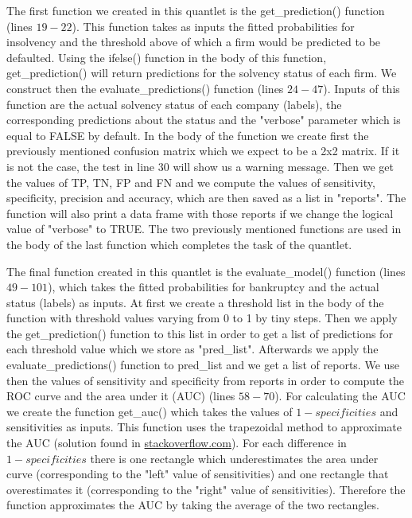 \documentclass{article}
\begin{document}
The first function we created in this quantlet is the get\_prediction() function (lines $19-22$). This function takes as inputs the fitted probabilities for insolvency and the threshold above of which a firm would be predicted to be defaulted. Using the ifelse() function in the body of this function, get\_prediction() will return predictions for the solvency status of each firm. We construct then the evaluate\_predictions() function (lines $24-47$). Inputs of this function are the actual solvency status of each company (labels), the corresponding predictions about the status and the "verbose" parameter which is equal to FALSE by default. In the body of the function we create first the previously mentioned confusion matrix which we expect to be a 2x2 matrix. If it is not the case, the test in line 30 will show us a warning message. Then we get the values of TP, TN, FP and FN and we compute the values of sensitivity, specificity, precision and accuracy, which are then saved as a list in "reports". The function will also print a data frame with those reports if we change the logical value of "verbose" to TRUE. The two previously mentioned functions are used in the body of the last function which completes the task of the quantlet. 

The final function created in this quantlet is the evaluate\_model() function (lines $49-101$), which takes the fitted probabilities for bankruptcy and the actual status (labels) as inputs. At first we create a threshold list in the body of the function with threshold values varying from 0 to 1 by tiny steps. Then we apply the get\_prediction() function to this list in order to get a list of predictions for each threshold value which we store as "pred\_list". Afterwards we apply the evaluate\_predictions() function to pred\_list and we get a list of reports. We use then the values of sensitivity and specificity from reports in order to compute the ROC curve and the area under it (AUC) (lines $58-70$). For calculating the AUC we create the function get\_auc() which takes the values of $1-specificities$ and sensitivities as inputs. This function uses the trapezoidal method to approximate the AUC (solution found in \href{https://stackoverflow.com/questions/4954507/calculate-the-area-under-a-curve}{stackoverflow.com}). For each difference in $1-specificities$ there is one rectangle which underestimates the area under curve (corresponding to the "left" value of sensitivities) and one rectangle that overestimates it (corresponding to the "right" value of sensitivities). Therefore the function approximates the AUC by taking the average of the two rectangles. 
\end{document}
